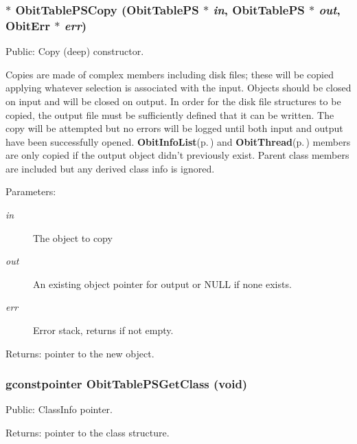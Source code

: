 \subsubsection{$\ast$ Obit\-Table\-PSCopy ({\bf Obit\-Table\-PS} $\ast$ {\em in}, {\bf Obit\-Table\-PS} $\ast$ {\em out}, {\bf Obit\-Err} $\ast$ {\em err})}\label{ObitTablePS_8c_a20}


Public: Copy (deep) constructor. 

Copies are made of complex members including disk files; these will be copied applying whatever selection is associated with the input. Objects should be closed on input and will be closed on output. In order for the disk file structures to be copied, the output file must be sufficiently defined that it can be written. The copy will be attempted but no errors will be logged until both input and output have been successfully opened. {\bf Obit\-Info\-List}{\rm (p.\,\pageref{structObitInfoList})} and {\bf Obit\-Thread}{\rm (p.\,\pageref{structObitThread})} members are only copied if the output object didn't previously exist. Parent class members are included but any derived class info is ignored. \begin{Desc}
\item[Parameters:]
\begin{description}
\item[{\em in}]The object to copy \item[{\em out}]An existing object pointer for output or NULL if none exists. \item[{\em err}]Error stack, returns if not empty. \end{description}
\end{Desc}
\begin{Desc}
\item[Returns:]pointer to the new object. \end{Desc}
\subsubsection{\setlength{\rightskip}{0pt plus 5cm}gconstpointer Obit\-Table\-PSGet\-Class (void)}\label{ObitTablePS_8c_a17}


Public: Class\-Info pointer. 

\begin{Desc}
\item[Returns:]pointer to the class structure. \end{Desc}
